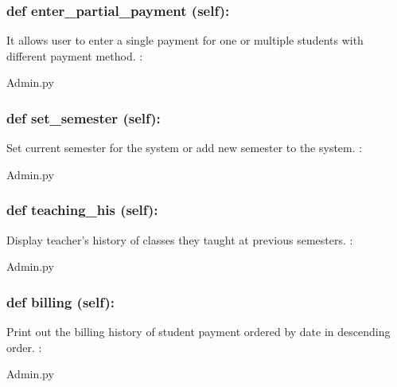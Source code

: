 \hypertarget{class_poly_a14a7ad77ce612b0c54f531d307ee4b39}{
\subsubsection[{def enter_partial_payment(self):}]{\setlength{\rightskip}{0pt plus 5cm}def {enter\_partial\_payment} (self):}}\label{class_poly_a14a7ad77ce612b0c54f531d307ee4b39}
It allows user to enter a single payment for one or multiple students with different payment method.
:\begin{DoxyCompactItemize}
\item 
Admin.\-py\end{DoxyCompactItemize}

\hypertarget{class_poly_a14a7ad77ce612b0c54f531d307ee4b39}{
\subsubsection[{def set_semester(self):}]{\setlength{\rightskip}{0pt plus 5cm}def {set\_semester} (self):}}\label{class_poly_a14a7ad77ce612b0c54f531d307ee4b39}
Set current semester for the system or add new semester to the system.
:\begin{DoxyCompactItemize}
\item 
Admin.\-py\end{DoxyCompactItemize}

\hypertarget{class_poly_a14a7ad77ce612b0c54f531d307ee4b39}{
\subsubsection[{def teaching_his(self):}]{\setlength{\rightskip}{0pt plus 5cm}def {teaching\_his} (self):}}\label{class_poly_a14a7ad77ce612b0c54f531d307ee4b39}
Display teacher's history of classes they taught at previous semesters.   
:\begin{DoxyCompactItemize}
\item 
Admin.\-py\end{DoxyCompactItemize}

\hypertarget{class_poly_a14a7ad77ce612b0c54f531d307ee4b39}{
\subsubsection[{def billing(self):}]{\setlength{\rightskip}{0pt plus 5cm}def {billing} (self):}}\label{class_poly_a14a7ad77ce612b0c54f531d307ee4b39}
Print out the billing history of student payment ordered by date in descending order.
:\begin{DoxyCompactItemize}
\item 
Admin.\-py\end{DoxyCompactItemize}

